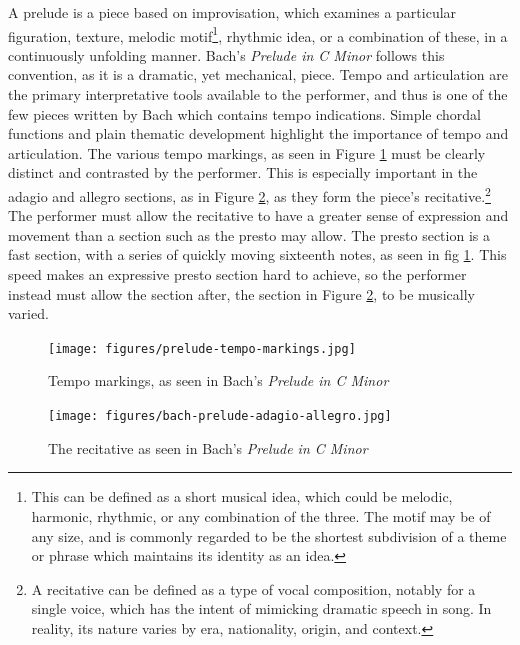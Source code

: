 A prelude is a piece based on improvisation, which examines a particular figuration, texture, melodic motif\autocite{Drabkin_2001}\footnote{This can be defined as a short musical idea, which could be melodic, harmonic, rhythmic, or any combination of the three. The motif may be of any size, and is commonly regarded to be the shortest subdivision of a theme or phrase which maintains its identity as an idea.}, rhythmic idea, or a combination of these, in a continuously unfolding manner. Bach's \textit{Prelude in C Minor} follows this convention, as it is a dramatic, yet mechanical, piece. Tempo and articulation are the primary interpretative tools available to the performer, and thus is one of the few pieces written by Bach which contains tempo indications. Simple chordal functions and plain thematic development highlight the importance of tempo and articulation. The various tempo markings, as seen in Figure \ref{fig:prelude-tempo-markings}\autocite{Henle_2009} must be clearly distinct and contrasted by the performer. This is especially important in the adagio and allegro sections, as in Figure \ref{fig:prelude-recitative}\autocite{Henle_2009},
as they form the piece's recitative.\footnote{A recitative can be defined as a type of vocal composition, notably for a single voice, which has the intent of mimicking dramatic speech in song. In reality, its nature varies by era, nationality, origin, and context.}\autocite{Monson_Westrup_Budden_2001} The performer must allow the recitative to have a greater sense of expression and movement than a section such as the presto may allow. The presto section is a fast section, with a series of quickly moving sixteenth notes, as seen in fig \ref{fig:prelude-tempo-markings}\autocite{Henle_2009}. This speed makes an expressive presto section hard to achieve, so the performer instead must allow the section after, the section in Figure \ref{fig:prelude-recitative}\autocite{Henle_2009}, to be musically varied. 
\begin{figure}
    \centering
    \texttt{[image: figures/prelude-tempo-markings.jpg]}
    \caption{Tempo markings, as seen in Bach's \textit{Prelude in C Minor}}
    \label{fig:prelude-tempo-markings}
\end{figure}

\begin{figure}
    \centering
    \texttt{[image: figures/bach-prelude-adagio-allegro.jpg]}
    \caption{The recitative as seen in Bach's \textit{Prelude in C Minor}}
    \label{fig:prelude-recitative}
\end{figure}


